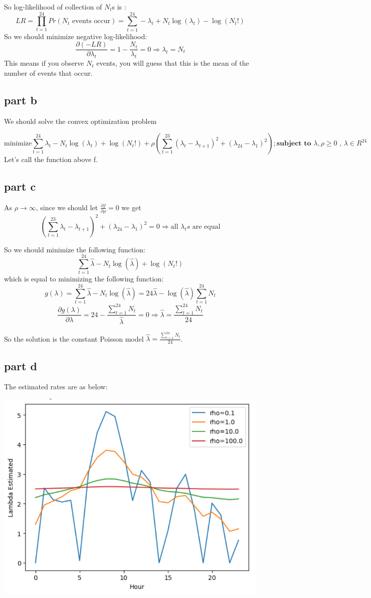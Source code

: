 \documentclass{uofa-eng-assignment}
\begin{document}
So log-likelihood of collection of $N_t$s is :
\[
LR = \prod_{t=1}^{24} Pr(N_t \text{ events occur}) =  \sum_{t=1}^{24}  -\lambda_t + N_t \log (\lambda_t) - \log(N_t!) 
\]
So we should minimize negative log-likelihood:
\[
\frac{\partial (-LR)}{\partial \lambda_t} = 1 - \frac{N_t}{\lambda_t} = 0 \Rightarrow \lambda_t = N_t
\]
This means
if you observe $N_t$ events, you will
guess that this is the mean of the number of events that occur.


\subsection*{part b}

We should solve the convex optimization problem

\[
\text{minimize} \sum_{t=1}^{24}  \lambda_t - N_t \log (\lambda_t) + \log(N_t!) + \rho (\sum_{t=1}^{23} (\lambda_t-\lambda_{t+1})^2 +(\lambda_{24} - \lambda_1)^2);\textbf{subject to } \lambda,\rho \ge 0\textbf{ , } \lambda\in R^{24}
\]
Let's call the function above f.

\subsection*{part c}
As $\rho\to\infty$, since we should let $\frac{\partial f}{\partial \rho} = 0$ we get 
\[
(\sum_{t=1}^{23}\lambda_t-\lambda_{t+1})^2 +(\lambda_{24} - \lambda_1)^2 = 0 \Rightarrow \text{all } \lambda_ts \text{ are equal}
\]

So we should minimize the following function:
\[
\sum_{t=1}^{24}  \hat{\lambda} - N_t \log (\hat{\lambda}) + \log(N_t!) 
\]
which is equal to minimizing the following function:
\[
g(\lambda) = \sum_{t=1}^{24}  \hat{\lambda} - N_t \log (\hat{\lambda}) = 24\hat{\lambda} - \log (\hat{\lambda}) \sum_{t=1}^{24}  N_t 
\]
\[
\frac{\partial g(\lambda)}{\partial \lambda} = 24 - \frac{\sum_{t=1}^{24} N_t}{\hat{\lambda}} = 0 \Rightarrow \hat{\lambda} = \frac{\sum_{t=1}^{24} N_t}{24}
\]

So the solution is the constant Poisson model $\hat{\lambda} = \frac{\sum_{t=1}^{24} N_t}{24}$. 

\subsection*{part d}

The estimated rates are as below:

\begin{center}
	\includegraphics[width=0.65\linewidth]{screenshot001}
\end{center}
\end{document}
